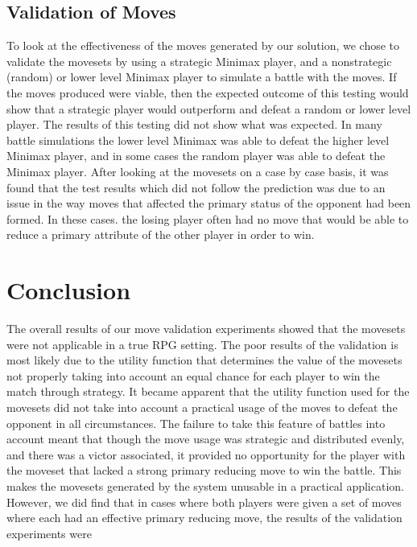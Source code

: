 \documentclass{acm_proc_article-sp}
\begin{document}
\subsection{Validation of Moves}
To look at the effectiveness of the moves generated by our solution, we chose to validate the movesets by using a strategic Minimax player, and a nonstrategic (random) or lower level Minimax player to simulate a battle with the moves. If the moves produced were viable, then the expected outcome of this testing would show that a strategic player would outperform and defeat a random or lower level player.
The results of this testing did not show what was expected. In many battle simulations the lower level Minimax was able to defeat the higher level Minimax player, and in some cases the random player was able to defeat the Minimax player. After looking at the movesets on a case by case basis, it was found that the test results which did not follow the prediction was due to an issue in the way moves that affected the primary status of the opponent had been formed. In these cases. the losing player often had no move that would be able to reduce a primary attribute of the other player in order to win.

\section{Conclusion}
The overall results of our move validation experiments showed that the movesets were not applicable in a true RPG setting. The poor results of the validation is most likely due to the utility function that determines the value of the movesets not properly taking into account an equal chance for each player to win the match through strategy.  It became apparent that the utility function used for the movesets did not take into account a practical usage of the moves to defeat the opponent in all circumstances. The failure to take this feature of battles into account meant that though the move usage was strategic and distributed evenly, and there was a victor associated, it provided no opportunity for the player with the moveset that lacked a strong primary reducing move to win the battle. This makes the movesets generated by the system unusable in a practical application.
However, we did find that in cases where both players were given a set of moves where each had an effective primary reducing move, the results of the validation experiments were 

\end{document}
